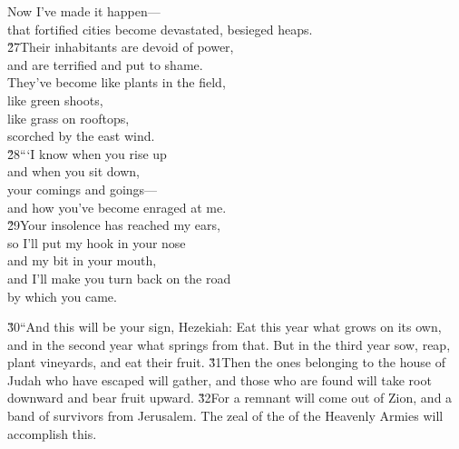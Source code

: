 \begin{poetry}
\poeml Now I've made it happen--- \\
\poemll    that fortified cities become devastated, besieged heaps. \\
\poeml \v{27}Their inhabitants are devoid of power, \\
\poemll    and are terrified and put to shame. \\
\poeml They've become like plants in the field, \\
\poemll    like green shoots, \\
\poeml like grass on rooftops, \\
\poemll    scorched by the east wind. \\
\poeml \v{28}```I know when you rise up \\
\poemll    and when you sit down, \\
\poeml your comings and goings--- \\
\poemll    and how you've become enraged at me. \\
\poeml \v{29}Your insolence has reached my ears, \\
\poemll    so I'll put my hook in your nose \\
\poemlll       and my bit in your mouth, \\
\poeml and I'll make you turn back on the road \\
\poemll    by which you came.
\end{poetry}

\v{30}``And this will be your sign, Hezekiah: Eat this year what grows on its own, and in the second year what springs from that. But in the third year sow, reap, plant vineyards, and eat their fruit. \v{31}Then the ones belonging to the house of Judah who have escaped will gather, and those who are found will take root downward and bear fruit upward. \v{32}For a remnant will come out of Zion, and a band of survivors from Jerusalem. The zeal of the  of the Heavenly Armies will accomplish this.

